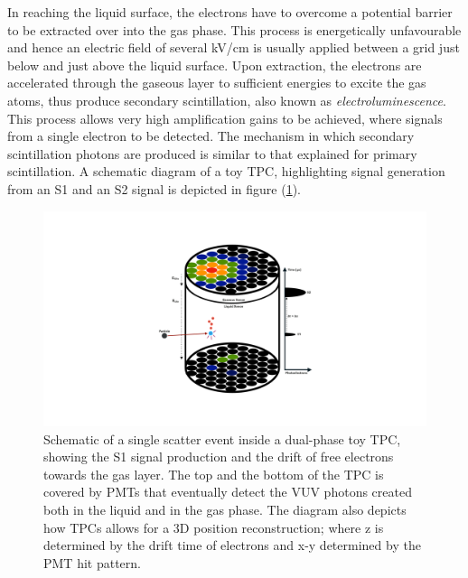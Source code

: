 In reaching the liquid surface, the electrons have to overcome a potential barrier to be extracted over into the gas phase. This process is energetically unfavourable and hence an electric field of several kV/cm is usually applied between a grid just below and just above the liquid surface. Upon extraction, the electrons are accelerated through the gaseous layer to sufficient energies to excite the gas atoms, thus produce secondary scintillation, also known as \textit{electroluminescence}. This process allows very high amplification gains to be achieved, where signals from a single electron to be detected. The mechanism in which secondary scintillation photons are produced is similar to that explained for primary scintillation. A schematic diagram of a toy TPC, highlighting signal generation from an S1 and an S2 signal is depicted in figure (\ref{fig:tpc_diagram}). 
%
\begin{figure}[hb!]
    \begin{center}
        \includegraphics[scale=0.30]{Chapter_2/Figures/TPC_Diagram.pdf}
        \caption[Schematic of a single scatter event inside a dual-phase toy TPC, showing the S1 signal production and the drift of free electrons towards the gas layer]%
        {Schematic of a single scatter event inside a dual-phase toy TPC, showing the S1 signal production and the drift of free electrons towards the gas layer. The top and the bottom of the TPC is covered by PMTs that eventually detect the VUV photons created both in the liquid and in the gas phase. The diagram also depicts how TPCs allows for a 3D position reconstruction; where z is determined by the drift time of electrons and x-y determined by the PMT hit pattern.}
        \label{fig:tpc_diagram}
        \end{center}
\end{figure}
%


